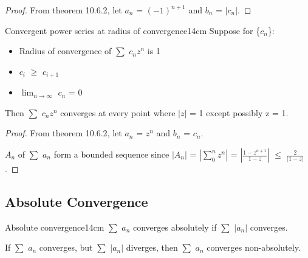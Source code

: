     \begin{proof}
        From {\color{red} theorem 10.6.2}, let
        $a_n$ = $(-1)^{n+1}$ and $b_n$ = $|c_n|$.
    \end{proof}

    \vspace{0.5cm}



    \begin{corollary}{Convergent power series at radius of convergence}{14cm}
        Suppose for \{$c_n$\}:

        \begin{itemize}[leftmargin=1cm, itemsep=0.1cm]
            \item Radius of convergence of $\sum$ $c_n z^n$ is 1
            
            \item $c_i$ $\geq$ $c_{i+1}$
            
            \item $\lim_{n \rightarrow \infty}$ $c_n$ = 0
        \end{itemize}

        Then $\sum$ $c_n z^n$ converges at every point where $|z|$ = 1
        except possibly z = 1.
    \end{corollary}

    \begin{proof}
        From {\color{red} theorem 10.6.2}, let
        $a_n$ = $z^n$ and $b_n$ = $c_n$.

        $A_n$ of $\sum$ $a_n$ form a bounded sequence since
        $| A_n |$
        = $| \sum_0^n z^n |$
        = $| \frac{1 - z^{n+1}}{1 - z} |$
        $\leq$ $\frac{2}{|1 - z|}$.        
    \end{proof}

    \vspace{0.5cm}





\subsection{ Absolute Convergence }

    \begin{definition}{Absolute convergence}{14cm}
        $\sum$ $a_n$ converges absolutely if $\sum$ $|a_n|$ converges.

        If $\sum$ $a_n$ converges, but $\sum$ $|a_n|$ diverges,
        then $\sum$ $a_n$ converges non-absolutely.
    \end{definition}

